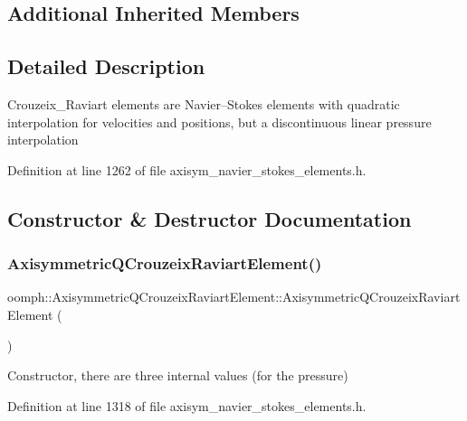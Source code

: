 \subsection*{Additional Inherited Members}


\subsection{Detailed Description}
Crouzeix\+\_\+\+Raviart elements are Navier--Stokes elements with quadratic interpolation for velocities and positions, but a discontinuous linear pressure interpolation 

Definition at line 1262 of file axisym\+\_\+navier\+\_\+stokes\+\_\+elements.\+h.



\subsection{Constructor \& Destructor Documentation}
\mbox{\label{classoomph_1_1AxisymmetricQCrouzeixRaviartElement_a971e34ee93385674ff784d9b1baf1871}} 
\subsubsection{\texorpdfstring{Axisymmetric\+Q\+Crouzeix\+Raviart\+Element()}{AxisymmetricQCrouzeixRaviartElement()}}
{\footnotesize\ttfamily oomph\+::\+Axisymmetric\+Q\+Crouzeix\+Raviart\+Element\+::\+Axisymmetric\+Q\+Crouzeix\+Raviart\+Element (\begin{DoxyParamCaption}{ }\end{DoxyParamCaption})\hspace{0.3cm}{\ttfamily [inline]}}



Constructor, there are three internal values (for the pressure) 



Definition at line 1318 of file axisym\+\_\+navier\+\_\+stokes\+\_\+elements.\+h.



